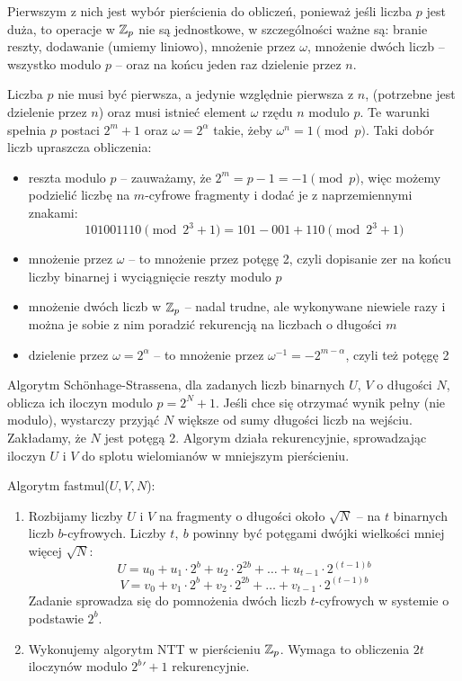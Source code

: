 Pierwszym z nich jest wybór pierścienia do obliczeń, ponieważ jeśli liczba \( p \) jest duża, to operacje w \( \mathbb{Z}_p \) nie są jednostkowe, w szczególności ważne są: branie reszty, dodawanie (umiemy liniowo), mnożenie przez \( \omega \), mnożenie dwóch liczb -- wszystko modulo \( p \) -- oraz na końcu jeden raz dzielenie przez \( n \).

Liczba \( p \) nie musi być pierwsza, a jedynie względnie pierwsza z \( n \), (potrzebne jest dzielenie przez \( n \)) oraz musi istnieć element \( \omega \) rzędu \( n \) modulo \( p \). Te warunki spełnia \( p \) postaci \( 2^m + 1 \) oraz \( \omega = 2^{\alpha} \) takie, żeby \( \omega^n = 1 \pmod{p} \). Taki dobór liczb upraszcza obliczenia:
\begin{itemize}
    \item reszta modulo \( p \) -- zauważamy, że \( 2^m = p - 1 = -1 \pmod{p} \), więc możemy podzielić liczbę na \( m \)-cyfrowe fragmenty i dodać je z naprzemiennymi znakami:
    \[
        101001110 \pmod{2^3 + 1} = 101 - 001 + 110 \pmod{2^3 + 1} 
    \]
    \item mnożenie przez \( \omega \) -- to mnożenie przez potęgę 2, czyli dopisanie zer na końcu liczby binarnej i wyciągnięcie reszty modulo \( p \)
    \item mnożenie dwóch liczb w \( \mathbb{Z}_p \) -- nadal trudne, ale wykonywane niewiele razy i można je  sobie z nim poradzić rekurencją na liczbach o długości \( m \)
    \item dzielenie przez \( \omega = 2^{\alpha} \) -- to mnożenie przez \( \omega^{-1} = -2^{m-\alpha} \), czyli też potęgę 2
\end{itemize}

Algorytm Sch{\"o}nhage-Strassena, dla zadanych liczb binarnych \( U \), \( V \) o długości \( N \), oblicza ich iloczyn modulo \( p = 2^N + 1 \).
Jeśli chce się otrzymać wynik pełny (nie modulo), wystarczy przyjąć \( N \) większe od sumy długości liczb na wejściu. Zakładamy, że \( N \) jest potęgą 2. Algorym działa rekurencyjnie, sprowadzając iloczyn \( U \) i \( V \) do splotu wielomianów w mniejszym pierścieniu.

\begin{greyframe}
    Algorytm fastmul(\( U, V, N \)):
    \begin{enumerate}
        \item Rozbijamy liczby \( U \) i \( V \) na fragmenty o długości około \( \sqrt{N} \) -- na \( t \) binarnych liczb \( b \)-cyfrowych. Liczby \( t, \ b \) powinny być potęgami dwójki wielkości mniej więcej \( \sqrt{N} \):
        \[
            U = u_0 + u_1 \cdot 2^b + u_2 \cdot 2^{2b} + \ldots + u_{t-1} \cdot  2^{(t-1)b}
        \]
        \[
            V = v_0 + v_1 \cdot 2^b + v_2 \cdot 2^{2b} + \ldots + v_{t-1} \cdot 2^{(t-1)b}
        \]
        Zadanie sprowadza się do pomnożenia dwóch liczb \( t \)-cyfrowych w systemie o podstawie \( 2^b \).

        \item Wykonujemy algorytm NTT w pierścieniu \( \mathbb{Z}_p \). Wymaga to obliczenia \( 2t \) iloczynów modulo \( 2^b' + 1 \) rekurencyjnie.
    \end{enumerate}
\end{greyframe}

